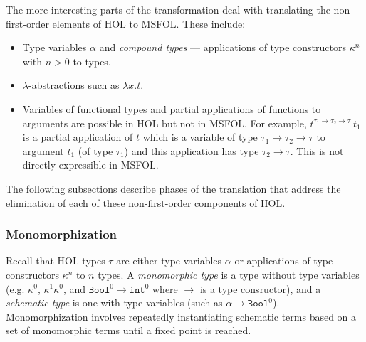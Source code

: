 \documentclass{article}
\begin{document}
	The more interesting parts of the 
	transformation deal with 
	translating the non-first-order
	elements of HOL to MSFOL. These 
	include:
	\begin{itemize}
		\item Type variables $\alpha$
		and \textit{compound types} ---
		applications of type constructors
		$\kappa^n$ with $n > 0$ to 
		types.
		\item $\lambda$-abstractions 
		such as $\lambda x. t$.
		\item Variables of functional 
		types and partial applications 
		of functions to arguments are 
		possible in HOL but not in 
		MSFOL. For example, 
		$t^{\tau_1 \to \tau_2 \to 
			\tau}\ t_1$ is a 
		partial application of $t$ 
		which is a variable of type 
		$\tau_1 \to \tau_2 \to \tau$
		to argument $t_1$ (of type 
		$\tau_1$) and this 
		application has type 
		$\tau_2 \to \tau$.
		This is not directly 
		expressible in MSFOL.
	\end{itemize}
	The following subsections describe
	phases of the translation that 
	address the elimination of each of 
	these non-first-order components of 
	HOL.
	
	\subsubsection{Monomorphization}
	Recall that HOL types $\tau$ are 
	either type	variables $\alpha$ or 
	applications of type constructors 
	$\kappa^n$ to $n$ types.
	A \textit{monomorphic type} is a
	type without type variables 
	(e.g. $\kappa^0$, $\kappa^1 
	\kappa^0$, and $\texttt{Bool}^0 
	\to \texttt{int}^0$ 
	where $\to$ is 
	a type consructor), and 
	a \textit{schematic type} is one 
	with type variables (such as 
	$\alpha \to \texttt{Bool}^0$). 
	Monomorphization involves 
	repeatedly instantiating schematic
	terms based on a set of 
	monomorphic terms until a fixed 
	point is reached.
	
\end{document}
